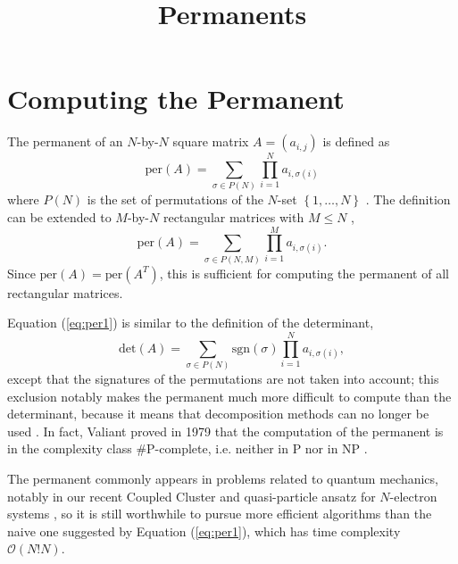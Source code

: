 \documentclass{article}
\title{Permanents}
\begin{document}
\section*{Computing the Permanent}

The permanent of an $N$-by-$N$ square matrix $A = \left(a_{i,j}\right)$ is defined as
\begin{equation} \label{eq:per1}
    \text{per}(A) = \sum_{\sigma \in P(N)}{\prod_{i=1}^N{a_{i,{\sigma(i)}}}}
\end{equation}
where $P(N)$ is the set of permutations of the $N$-set $\left\{1,\dots,N\right\}$
\cite{wiki:permanent}. The definition can be extended to $M$-by-$N$ rectangular matrices with
$M \leq N$ \cite{wiki:permanent},
\begin{equation} \label{eq:rectper1}
    \text{per}(A) = \sum_{\sigma \in P(N,M)}{\prod_{i=1}^M{a_{i,{\sigma(i)}}}}.
\end{equation}
Since $\text{per}(A) = \text{per}(A^T)$, this is sufficient for computing the permanent of all
rectangular matrices.

Equation (\ref{eq:per1}) is similar to the definition of the determinant,
\begin{equation} \label{eq:det1}
    \text{det}(A) = \sum_{\sigma \in P(N)}{\text{sgn}(\sigma) \prod_{i=1}^N{a_{i,{\sigma(i)}}}},
\end{equation}
except that the signatures of the permutations are not taken into account; this exclusion notably
makes the permanent much more difficult to compute than the determinant, because it means that
decomposition methods can no longer be used \cite{wiki:computing}. In fact, Valiant proved in 1979
that the computation of the permanent is in the complexity class \#P-complete, i.e.  neither in
P nor in NP \cite{valiant1979}.

The permanent commonly appears in problems related to quantum mechanics,
notably in our recent Coupled Cluster and quasi-particle ansatz for $N$-electron systems
\cite{limacher2013,johnson2017,kim2021}, so it is still worthwhile to pursue more efficient
algorithms than the naive one suggested by Equation (\ref{eq:per1}), which has time complexity
$\mathcal{O}(N!N)$.
\end{document}
